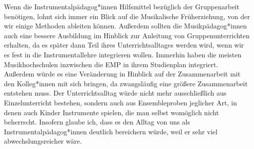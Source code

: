 Wenn die Instrumentalpädagog*innen Hilfsmittel bezüglich der Gruppenarbeit
benötigen, lohnt sich immer ein Blick auf die Musikalische Früherziehung, von
der wir einige Methoden ableiten können. Außerdem sollten die Musikpädagog*innen
auch eine bessere Ausbildung im Hinblick zur Anleitung von Gruppenunterrichten
erhalten, da es später dann Teil ihres Unterrichtsalltages werden wird, wenn wir
es fest in die Instrumentallehre integrieren wollen. Immerhin haben die meisten
Musikhochschulen inzwischen die EMP in ihrem Studienplan integriert. Außerdem
würde es eine Veränderung in Hinblick auf der Zusammenarbeit mit den
Kolleg*innen mit sich bringen, da zwangsläufig eine größere Zusammenarbeit
entstehen muss. Der Unterrichtsalltag würde nicht mehr ausschließlich aus
Einzelunterricht bestehen, sondern auch aus Ensembleproben jeglicher Art,
in denen auch Kinder Instrumente spielen, die man selbst womöglich nicht
beherrscht. Insofern glaube ich, dass es den Alltag von uns als
Instrumentalpädagog*innen deutlich bereichern würde, weil er sehr viel
abwechslungsreicher wäre. 














